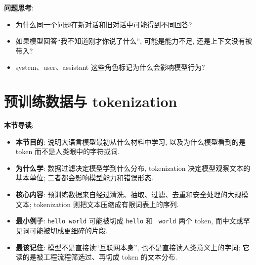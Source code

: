 \documentclass{../nndlcourse}
\begin{document}
\textbf{问题思考}:
\begin{itemize}
  \item 为什么同一个问题在新对话和旧对话中可能得到不同回答?
  \item 如果模型回答“我不知道刚才你说了什么”, 可能是能力不足, 还是上下文没有被带入?
  \item system、user、assistant 这些角色标记为什么会影响模型行为?
\end{itemize}

\section{预训练数据与 tokenization}

\textbf{本节导读}:
\begin{itemize}
  \item \textbf{本节目的}: 说明大语言模型最初从什么材料中学习, 以及为什么模型看到的是 token 而不是人类眼中的字符或词.
  \item \textbf{为什么学}: 数据过滤决定模型学到什么分布, tokenization 决定模型观察文本的基本单位; 二者都会影响模型能力和错误形态.
  \item \textbf{核心内容}: 预训练数据来自经过清洗、抽取、过滤、去重和安全处理的大规模文本; tokenization 则把文本压缩成有限词表上的序列.
  \item \textbf{最小例子}: \texttt{hello world} 可能被切成 \texttt{hello} 和 \texttt{ world} 两个 token, 而中文或罕见词可能被切成更细碎的片段.
  \item \textbf{最该记住}: 模型不是直接读“互联网本身”, 也不是直接读人类意义上的字词; 它读的是被工程流程筛选过、再切成 token 的文本分布.
\end{itemize}
\end{document}
